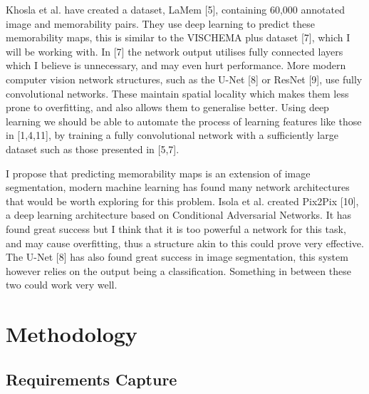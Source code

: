 \documentclass{UoYCSproject}
\begin{document}
Khosla et al. have created a dataset, LaMem [5], containing 60,000 annotated image and memorability pairs. They use deep learning to predict these memorability maps, this is similar to the VISCHEMA plus dataset [7], which I will be working with. In [7] the network output utilises fully connected layers which I believe is unnecessary, and may even hurt performance. More modern computer vision network structures, such as the U-Net [8] or ResNet [9], use fully convolutional networks. These maintain spatial locality which makes them less prone to overfitting, and also allows them to generalise better. Using deep learning we should be able to automate the process of learning features like those in [1,4,11], by training a fully convolutional network with a sufficiently large dataset such as those presented in [5,7].

I propose that predicting memorability maps is an extension of image segmentation, modern machine learning has found many network architectures that would be worth exploring for this problem. Isola et al. created Pix2Pix [10], a deep learning architecture based on Conditional Adversarial Networks. It has found great success but I think that it is too powerful a network for this task, and may cause overfitting, thus a structure akin to this could prove very effective. The U-Net [8] has also found great success in image segmentation, this system however relies on the output being a classification. Something in between these two could work very well.

\newpage{}

\chapter{Methodology}




\section{Requirements Capture}
\end{document}
